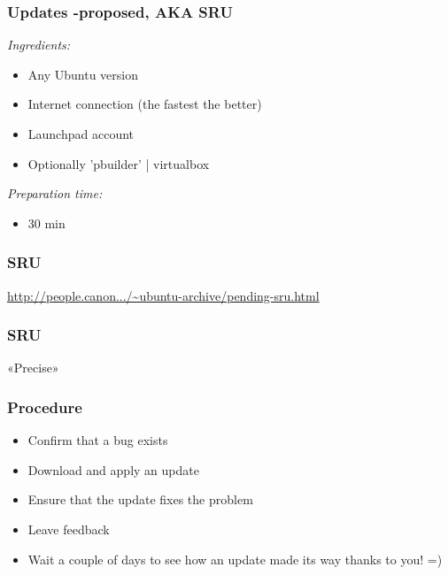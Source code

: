 \documentclass[dvipsnames]{beamer}
\begin{document}
\begin{frame}
  \frametitle {Updates -proposed, AKA SRU}

  {\em Ingredients:}
  \begin{itemize}
  \item Any Ubuntu version
  \item Internet connection (the fastest the better)
  \item Launchpad account
  \item Optionally 'pbuilder' | virtualbox
  \end{itemize}

  {\vspace{3 mm}
  \em Preparation time:}
  \begin{itemize}
  \item 30 min
  \end{itemize}
\end{frame}

\begin{frame}
  \frametitle{SRU}
  \begin{center}
  \end{center}
  \begin{center}
      \url{http://people.canon.../~ubuntu-archive/pending-sru.html}
  \end{center}
\end{frame}

\begin{frame}
  \frametitle{SRU}
  \begin{center}
  \end{center}
  \begin{center}
      «Precise»
  \end{center}
\end{frame}

\begin{frame}
  \frametitle{Procedure}
  \begin{itemize}
  \item Confirm that a bug exists
  \item Download and apply an update
  \item Ensure that the update fixes the problem
  \item Leave feedback
  \item Wait a couple of days to see how an update made its way thanks to you! =)
  \end{itemize}
\end{frame}
\end{document}
